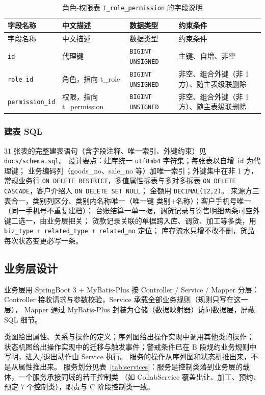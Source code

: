 \documentclass[12pt, a4paper]{ctexart}
\newcommand{\code}[1]{\texttt{\small #1}}
\begin{document}
\begin{longtable}{@{}p{3.1cm} p{4.5cm} p{2.4cm} p{4.5cm}@{}}
\caption{角色-权限表 \code{t\_role\_permission} 的字段说明}\label{tab:f-t-role-permission}\\
\toprule
字段名称 & 中文描述 & 数据类型 & 约束条件 \\
\midrule
\endfirsthead
\toprule
字段名称 & 中文描述 & 数据类型 & 约束条件 \\
\midrule
\endhead
\bottomrule
\endlastfoot
\code{id} & 代理键 & \code{BIGINT UNSIGNED} & 主键、自增、非空 \\
\code{role\_id} & 角色，指向 t\_role & \code{BIGINT UNSIGNED} & 非空、组合外键（非 1 方）、随主表级联删除 \\
\code{permission\_id} & 权限，指向 t\_permission & \code{BIGINT UNSIGNED} & 非空、组合外键（非 1 方）、随主表级联删除 \\
\end{longtable}

\subsubsection{建表 SQL}

31 张表的完整建表语句（含字段注释、唯一索引、外键约束）见 \code{docs/schema.sql}。
设计要点：建库统一 \code{utf8mb4} 字符集；每张表以自增 \code{id} 为代理键；
业务编码列（goods\_no、sale\_no 等）加唯一索引；外键集中在非 1 方，
常规业务行 \code{ON DELETE RESTRICT}，多值属性拆表与多对多拆表 \code{ON DELETE CASCADE}，客户介绍人 \code{ON DELETE SET NULL}；
金额用 \code{DECIMAL(12,2)}。
来源方三表合一，类别列区分、类别内名称唯一（唯一键 类别+名称）；客户手机号唯一（同一手机号不重复建档）；
台账结算一单一据，调货记录与寄售明细两条可空外键二选一，由业务层把关；
货款记录关联的单据跨入库、调货、加工等多类，用 \code{biz\_type + related\_type + related\_no} 定位；
库存流水只增不改不删，货品每次状态变更必写一条。

\subsection{业务层设计}

业务层用 SpringBoot 3 + MyBatis-Plus 按 Controller / Service / Mapper 分层：
Controller 接收请求与参数校验，Service 承载全部业务规则（规则只写在这一层），
Mapper 通过 MyBatis-Plus 封装为仓储（数据映射器）访问数据层，屏蔽 SQL 细节。

类图给出属性、关系与操作的定义；序列图给出操作实现中调用其他类的操作；
状态机图给出操作实现中的迁移与触发事件；警戒条件已在 B 段规约业务规则中写明，进入/退出动作由 Service 执行。
服务的操作从序列图和状态机推出来，不是从属性推出来。
服务划分见表~\ref{tab:services}：服务是控制类落到业务层的载体，一个服务承接同域的若干控制类
（如 CollabService 覆盖出让、加工、预约、预定 7 个控制类），职责与 C 阶段控制类一致。
\end{document}
